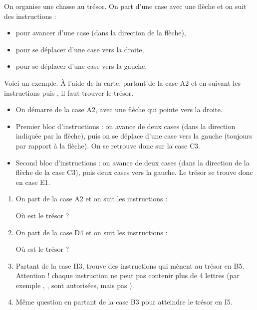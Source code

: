 \documentclass[class=report,crop=false, 12pt]{standalone}
\begin{document}
\begin{activite}
On organise une chasse au trésor. 
On part d'une case avec une flèche et on suit des instructions :
\begin{itemize}
  \item {} pour avancer d'une case (dans la direction de la flèche), 
  \item {} pour se déplacer d'une case vers la droite,
  \item {} pour se déplacer d'une case vers la gauche.
\end{itemize}  
Voici un exemple. À l'aide de la carte, partant de la case A2 et en suivant les instructions  puis , il faut trouver le trésor. 

\begin{itemize}
  \item On démarre de la case A2, avec une flèche qui pointe vers la droite.
  \item Premier bloc d'instructions  : on avance de deux cases (dans la direction indiquée par la flèche), puis on se déplace d'une case vers la gauche (toujours par rapport à la flèche). On se retrouve donc sur la case C3.
  \item Second bloc d'instructions  : on avance de deux cases (dans la direction de la flèche de la case C3), puis deux cases vers la gauche. Le trésor se trouve donc en case E1. 
\end{itemize}



\begin{enumerate}
  \item On part de la case A2 et on suit les instructions :

\centerline{}  

Où est le trésor ?
  
  
  \item On part de la case D4 et on suit les instructions :

\centerline{}  

Où est le trésor ?
  
  
  
  \item Partant de la case H3, trouve des instructions qui mènent au trésor en B5. Attention ! chaque instruction ne peut pas contenir plus de 4 lettres (par exemple , ,  sont autorisées, mais pas ).
  
  \item Même question en partant de la case B3 pour atteindre le trésor en I5.
  
\end{enumerate}


\end{activite}
\end{document}
